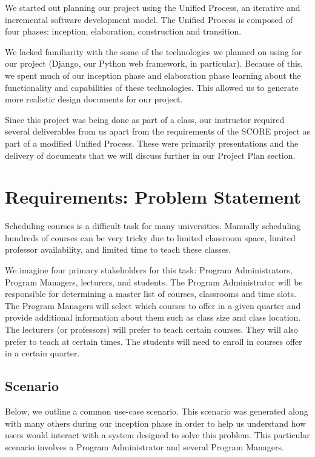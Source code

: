 \documentclass[12pt]{article}
\begin{document}
We started out planning our project using the Unified Process, an iterative and incremental software development model. The Unified Process is composed of four phases: inception, elaboration, construction and transition. 

We lacked familiarity with the some of the technologies we planned on using for our project (Django, our Python web framework, in particular). Because of this, we spent much of our inception phase and elaboration phase learning about the functionality and capabilities of these technologies. This allowed us to generate more realistic design documents for our project.

Since this project was being done as part of a class, our instructor required several deliverables from us apart from the requirements of the SCORE project as part of a modified Unified Process. These were primarily presentations and the delivery of documents that we will discuss further in our Project Plan section. 

\section{Requirements: Problem Statement} %
Scheduling courses is a difficult task for many universities. Manually scheduling hundreds of courses can be very tricky due to limited classroom space, limited professor availability, and limited time to teach these classes. 

We imagine four primary stakeholders for this task: Program Administrators, Program Managers, lecturers, and students. The Program Administrator will be responsible for determining a master list of courses, classrooms and time slots. The Program Managers will select which courses to offer in a given quarter and provide additional information about them such as class size and class location. The lecturers (or professors) will prefer to teach certain courses. They will also prefer to teach at certain times. The students will need to enroll in courses offer in a certain quarter.

\subsection{Scenario}

Below, we outline a common use-case scenario. This scenario was generated along with many others during our inception phase in order to help us understand how users would interact with a system designed to solve this problem. This particular scenario involves a Program Administrator and several Program Managers.
\end{document}
